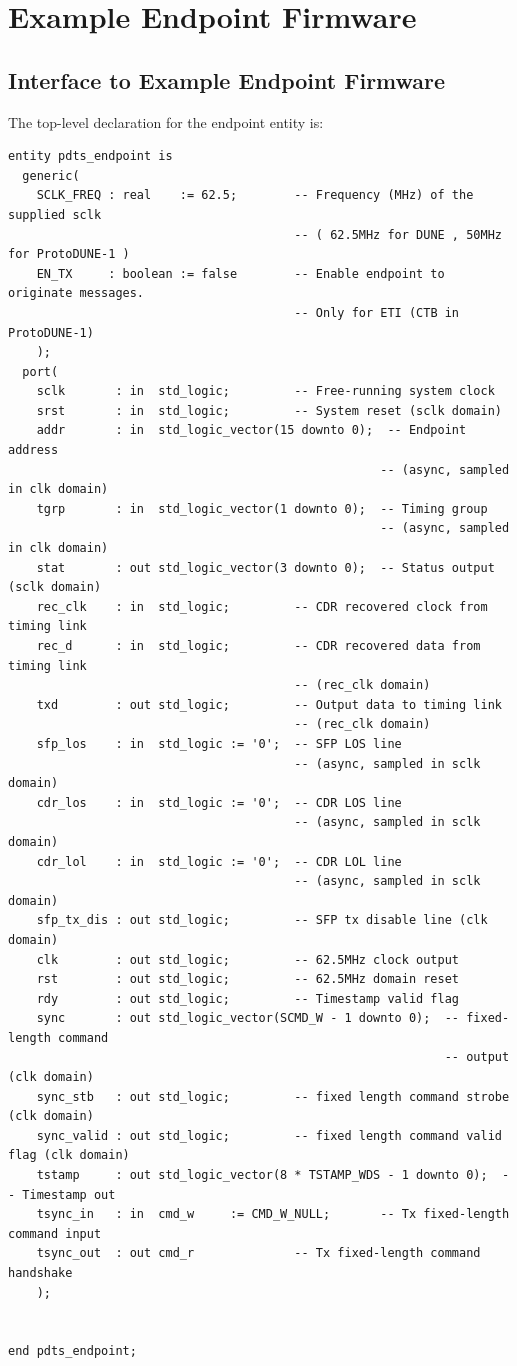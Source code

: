\documentclass{dune}
\begin{document}
\section{Example Endpoint Firmware}

\subsection{Interface to Example Endpoint Firmware }

The top-level declaration for the endpoint entity is:

\begin{verbatim}
entity pdts_endpoint is
  generic(
    SCLK_FREQ : real    := 62.5;        -- Frequency (MHz) of the supplied sclk
                                        -- ( 62.5MHz for DUNE , 50MHz for ProtoDUNE-1 )
    EN_TX     : boolean := false        -- Enable endpoint to originate messages.
                                        -- Only for ETI (CTB in ProtoDUNE-1)
    );
  port(
    sclk       : in  std_logic;         -- Free-running system clock
    srst       : in  std_logic;         -- System reset (sclk domain)
    addr       : in  std_logic_vector(15 downto 0);  -- Endpoint address
                                                    -- (async, sampled in clk domain)
    tgrp       : in  std_logic_vector(1 downto 0);  -- Timing group
                                                    -- (async, sampled in clk domain)
    stat       : out std_logic_vector(3 downto 0);  -- Status output (sclk domain)
    rec_clk    : in  std_logic;         -- CDR recovered clock from timing link
    rec_d      : in  std_logic;         -- CDR recovered data from timing link
                                        -- (rec_clk domain)
    txd        : out std_logic;         -- Output data to timing link
                                        -- (rec_clk domain)
    sfp_los    : in  std_logic := '0';  -- SFP LOS line
                                        -- (async, sampled in sclk domain)
    cdr_los    : in  std_logic := '0';  -- CDR LOS line
                                        -- (async, sampled in sclk domain)
    cdr_lol    : in  std_logic := '0';  -- CDR LOL line
                                        -- (async, sampled in sclk domain)
    sfp_tx_dis : out std_logic;         -- SFP tx disable line (clk domain)
    clk        : out std_logic;         -- 62.5MHz clock output
    rst        : out std_logic;         -- 62.5MHz domain reset
    rdy        : out std_logic;         -- Timestamp valid flag
    sync       : out std_logic_vector(SCMD_W - 1 downto 0);  -- fixed-length command
                                                             -- output (clk domain)
    sync_stb   : out std_logic;         -- fixed length command strobe (clk domain)
    sync_valid : out std_logic;         -- fixed length command valid flag (clk domain)
    tstamp     : out std_logic_vector(8 * TSTAMP_WDS - 1 downto 0);  -- Timestamp out
    tsync_in   : in  cmd_w     := CMD_W_NULL;       -- Tx fixed-length command input
    tsync_out  : out cmd_r              -- Tx fixed-length command handshake
    );


end pdts_endpoint;
\end{verbatim}
\end{document}
